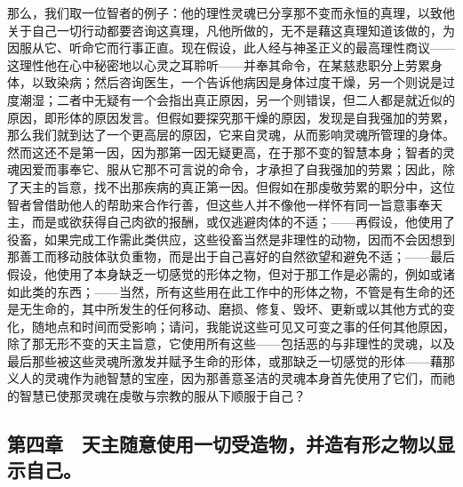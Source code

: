 那么，我们取一位智者的例子：他的理性灵魂已分享那不变而永恒的真理，以致他关于自己一切行动都要咨询这真理，凡他所做的，无不是藉这真理知道该做的，为因服从它、听命它而行事正直。现在假设，此人经与神圣正义的最高理性商议——这理性他在心中秘密地以心灵之耳聆听——并奉其命令，在某慈悲职分上劳累身体，以致染病；然后咨询医生，一个告诉他病因是身体过度干燥，另一个则说是过度潮湿；二者中无疑有一个会指出真正原因，另一个则错误，但二人都是就近似的原因，即形体的原因发言。但假如要探究那干燥的原因，发现是自我强加的劳累，那么我们就到达了一个更高层的原因，它来自灵魂，从而影响灵魂所管理的身体。然而这还不是第一因，因为那第一因无疑更高，在于那不变的智慧本身；智者的灵魂因爱而事奉它、服从它那不可言说的命令，才承担了自我强加的劳累；因此，除了天主的旨意，找不出那疾病的真正第一因。但假如在那虔敬劳累的职分中，这位智者曾借助他人的帮助来合作行善，但这些人并不像他一样怀有同一旨意事奉天主，而是或欲获得自己肉欲的报酬，或仅逃避肉体的不适；——再假设，他使用了役畜，如果完成工作需此类供应，这些役畜当然是非理性的动物，因而不会因想到那善工而移动肢体驮负重物，而是出于自己喜好的自然欲望和避免不适；——最后假设，他使用了本身缺乏一切感觉的形体之物，但对于那工作是必需的，例如或诸如此类的东西；——当然，所有这些用在此工作中的形体之物，不管是有生命的还是无生命的，其中所发生的任何移动、磨损、修复、毁坏、更新或以其他方式的变化，随地点和时间而受影响；请问，我能说这些可见又可变之事的任何其他原因，除了那无形不变的天主旨意，它使用所有这些——包括恶的与非理性的灵魂，以及最后那些被这些灵魂所激发并赋予生命的形体，或那缺乏一切感觉的形体——藉那义人的灵魂作为祂智慧的宝座，因为那善意圣洁的灵魂本身首先使用了它们，而祂的智慧已使那灵魂在虔敬与宗教的服从下顺服于自己？\par


\subsection{第四章　天主随意使用一切受造物，并造有形之物以显示自己。}

